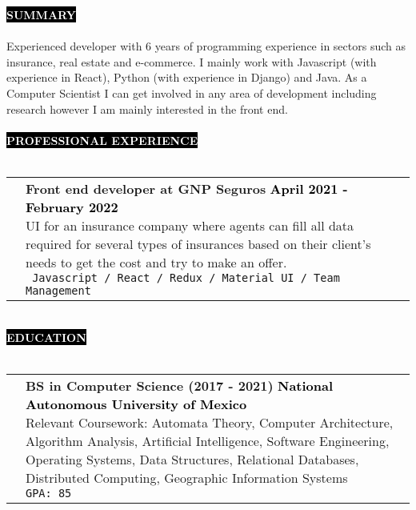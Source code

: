 \documentclass[11pt,A4]{article}
\makeatletter
\newcounter{a}
\newcounter{b}
\newcounter{c}
\newcommand{\cvsection}[1] {
	\textcolor{white}{\MakeUppercase{\textbf{#1}}}
}
\newcommand{\cvsect}[1]{
	\colorbox{black}{{\cvsection{#1}}}\\\\%
}
\newenvironment{entrylist}{%
	\begin{tabular*}{\textwidth}[t]{@{\extracolsep{\fill}}ll}
	}{%
	\end{tabular*}
}
\newcommand{\entry}[5]{%
	&\parbox[t]{17.5cm}{%
		\large\textbf{#1}%
		\hfill
		{\small \textbf{\textcolor{black}{#2}}}\\%
		\normalsize #4\\
		\texttt{#5}
	}\\\\}
\newcommand{\slashsep}{
	\hspace{2mm}/\hspace{2mm}
}
\makeatother
\begin{document}
	\cvsect{Summary}
	Experienced developer with 6 years of programming experience in sectors such as insurance, real estate and e-commerce. I mainly work with Javascript (with experience in React), Python (with experience in Django) and Java. As a Computer Scientist I can get involved in any area of development including research however I am mainly interested in the front end. \\
	\\
	\cvsect{Professional Experience}
	\begin{entrylist}
		\entry
		{Front end developer at GNP Seguros}
		{April 2021 - February 2022}
		{GNP Seguros}
		{UI for an insurance company where agents can fill all data required for several types of insurances based on their client's needs to get the cost and try to make an offer.}
		{ Javascript \slashsep React \slashsep Redux \slashsep Material UI \slashsep Team Management}
		\entry
		{Full stack developer at M22}
		{October 2020 - February 2021}
		{M22}
		{UI for a real estate company where people can view details and availability of several places for make purchase agreement. All the data updates in real time and the content is modified from a Content Management System(CMS).}
		{Javascript \slashsep React \slashsep Strapi JS \slashsep QGIS \slashsep GraphQL \slashsep PostgreSQL}
		\entry
		{Full stack developer at Ultra maratón sierra mixe}
		{January 2020 - September 2020}
		{Ultra maratón sierra mixe}
		{This is a client's project on the automation of the processes involved in the realization of a marathon race such as registration, marketing and payment.}
		{Javascript \slashsep React \slashsep Google Firebase \slashsep Bootstrap}
		\entry
		{Full stack developer}
		{Summer 2018}
		{Copnap}
		{Mobile application for Android to help teachers and students to know if a number is prime or not, also the app can give you the list of prime numbers in a range and calculate the Euler's totient function.}
		{Android Studio \slashsep Flutter \slashsep Dart}
	\end{entrylist}
	\\
	\cvsect{Education}
	\begin{entrylist}
		\entry
		{BS in Computer Science (\small 2017 - 2021)}
		{National Autonomous University of Mexico }
		{UNAM, Faculty of Science}
		{Relevant Coursework: Automata Theory, Computer Architecture, Algorithm Analysis, Artificial Intelligence, Software Engineering, Operating Systems, Data Structures, Relational Databases, Distributed Computing, Geographic Information Systems} 
		{GPA: 85}
	\end{entrylist}
\end{document}
